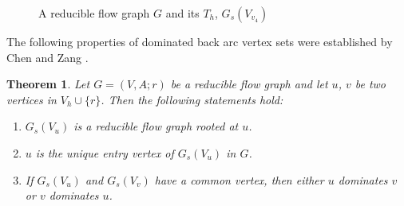 \documentclass[11pt]{article}
\newtheorem{theorem}{Theorem}[section]
\begin{document}
\begin{figure}
{\begin{minipage}[t]{0.33\linewidth}
          \label{fig:2b}
    \end{minipage}}
    \caption{A reducible flow graph $G$ and its $T_h$, $G_s(V_{v_4})$}
     \label{fig:2}
 \end{figure}

The following properties of dominated back arc vertex sets were established by Chen and Zang \cite{CheZ}.

\begin{theorem}
\label{thm:2}
Let $G=(V,A;r)$ be a reducible flow graph and let $u$, $v$ be two vertices in $V_h\cup\{r\}$. Then the following statements hold:
\begin{enumerate}[label=\emph{(}\alph*\emph{)}]
  \item $G_s(V_u)$ is a reducible flow graph rooted at $u$.
  \item $u$ is the unique entry vertex of $G_s(V_u)$ in $G$.
  \item If $G_s(V_u)$ and $G_s(V_v)$ have a common vertex, then either $u$ dominates $v$ or $v$ dominates $u$.
\end{enumerate}
\end{theorem}
\end{document}
